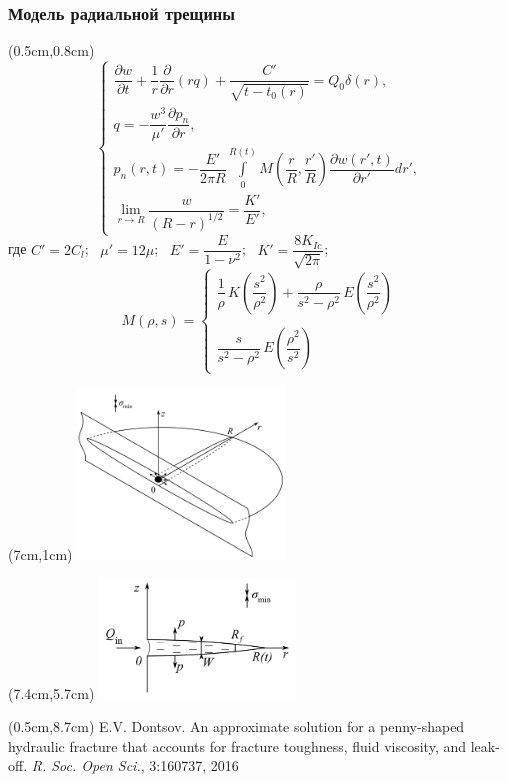 \documentclass{beamer}
\begin{document}
\begin{frame}
\frametitle{Модель радиальной трещины}

\scriptsize

\begin{textblock*}{7cm}(0.5cm,0.8cm)
$$
\begin{cases}
\dfrac{\partial w}{\partial t}+\dfrac{1}{r}\dfrac{\partial}{\partial r}\!\left(rq\right)+\dfrac{C'}{\sqrt{t-t_0(r)}}=Q_0\delta(r),\\[15pt]
q=-\dfrac{w^3}{\mu'}\dfrac{\partial p_n}{\partial r},\\[5pt]
p_n(r,t)=-\dfrac{E'}{2\pi R}\displaystyle\int\limits_{0}^{R(t)}M\!\left(\dfrac{r}{R},\dfrac{r'}{R}\right)\dfrac{\partial w(r',t)}{\partial r'}dr',\\[20pt]
\displaystyle\lim_{r\to R}\dfrac{w}{(R-r)^{1/2}}=\dfrac{K'}{E'},
\end{cases}
$$
где $C'=2C_l$; $\,\,\,\mu'=12\mu$; $\,\,\,E'=\dfrac{E}{1-\nu^2}$; $\,\,\,K'=\dfrac{8K_{Ic}}{\sqrt{2\pi}}$;
$$
M(\rho,s)=
\begin{cases}
\dfrac{1}{\rho}\,K\!\left(\dfrac{s^2}{\rho^2}\right)+\dfrac{\rho}{s^2-\rho^2}\,E\!\left(\dfrac{s^2}{\rho^2}\right)\\\ \\
\dfrac{s}{s^2-\rho^2}\,E\!\left(\dfrac{\rho^2}{s^2}\right)
\end{cases}
$$
\end{textblock*}

\begin{textblock*}{7cm}(7cm,1cm)
\includegraphics[width=5.5cm]{radial_model_3D.jpg}
\end{textblock*}

\begin{textblock*}{7cm}(7.4cm,5.7cm)
\includegraphics[width=5.2cm]{radial_model_A-A_plane.jpg}
\end{textblock*}

\begin{textblock*}{6cm}(0.5cm,8.7cm)
\tiny
\textcolor{lit_gray}{E.V. Dontsov. An approximate solution for a penny-shaped hydraulic fracture that accounts for fracture toughness, fluid viscosity, and leak-off. \emph{R. Soc. Open Sci.}, 3:160737, 2016}
\end{textblock*}

\normalsize

\end{frame}
\end{document}
